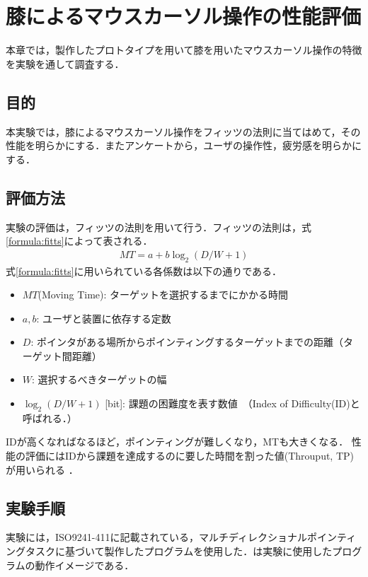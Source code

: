 \chapter{膝によるマウスカーソル操作の性能評価} 
本章では，製作したプロトタイプを用いて膝を用いたマウスカーソル操作の特徴を実験を通して調査する．
\section{目的}
本実験では，膝によるマウスカーソル操作をフィッツの法則\cite{fitts}に当てはめて，その性能を明らかにする．またアンケートから，ユーザの操作性，疲労感を明らかにする．
\section{評価方法}
実験の評価は，フィッツの法則を用いて行う．フィッツの法則は，式\ref{formula:fitts}によって表される．
\begin{eqnarray}
	MT = a + b\log_2{(D/W + 1)}
	\label{formula:fitts}
\end{eqnarray}
式\ref{formula:fitts}に用いられている各係数は以下の通りである．
\begin{itemize}
	\item {$MT$(Moving Time): }ターゲットを選択するまでにかかる時間
	\item {$a,b$: }ユーザと装置に依存する定数
	\item {$D$: }ポインタがある場所からポインティングするターゲットまでの距離（ターゲット間距離）%
	\item {$W$: }選択するべきターゲットの幅
	\item { $\log_2{(D/W + 1)}$ [bit]: } 課題の困難度を表す数値\ （Index of Difficulty(ID)と呼ばれる．）
\end{itemize}
IDが高くなればなるほど，ポインティングが難しくなり，MTも大きくなる．
性能の評価にはIDから課題を達成するのに要した時間を割った値(Throuput, TP)が用いられる
．
\begin{comment}
	\begin{eqnarray}
	TP = \cfrac{ID}{MT}
	\label{formula:tp}
\end{eqnarray}
\end{comment}

\section{実験手順}

実験には，ISO9241-411\cite{9241411}に記載されている，マルチディレクショナルポインティングタスクに基づいて製作したプログラムを使用した．は実験に使用したプログラムの動作イメージである．

